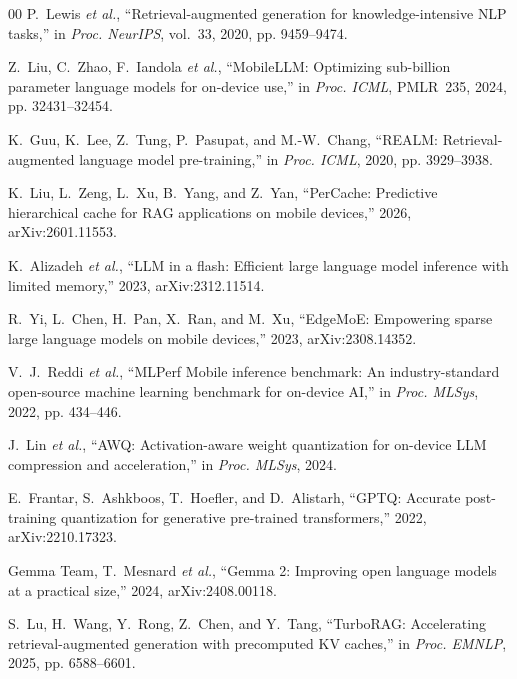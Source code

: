 \documentclass[10pt,conference]{IEEEtran}
\begin{document}
\begingroup
\scriptsize
\linespread{0.88}\selectfont
\def\IEEEbibitemsep{0pt}
\begin{thebibliography}{00}
\setlength{\itemsep}{-0.5pt plus 0.2pt}
\setlength{\parskip}{0pt}
P.~Lewis \textit{et al.}, ``Retrieval-augmented generation for knowledge-intensive {NLP} tasks,'' in \textit{Proc. NeurIPS}, vol.~33, 2020, pp. 9459--9474.

Z.~Liu, C.~Zhao, F.~Iandola \textit{et al.}, ``{MobileLLM}: Optimizing sub-billion parameter language models for on-device use,'' in \textit{Proc. ICML}, PMLR~235, 2024, pp. 32431--32454.

K.~Guu, K.~Lee, Z.~Tung, P.~Pasupat, and M.-W.~Chang, ``{REALM}: Retrieval-augmented language model pre-training,'' in \textit{Proc. ICML}, 2020, pp. 3929--3938.

K.~Liu, L.~Zeng, L.~Xu, B.~Yang, and Z.~Yan, ``{PerCache}: Predictive hierarchical cache for {RAG} applications on mobile devices,'' 2026, arXiv:2601.11553.

K.~Alizadeh \textit{et al.}, ``{LLM} in a flash: Efficient large language model inference with limited memory,'' 2023, arXiv:2312.11514.

R.~Yi, L.~Chen, H.~Pan, X.~Ran, and M.~Xu, ``{EdgeMoE}: Empowering sparse large language models on mobile devices,'' 2023, arXiv:2308.14352.

V.~J.~Reddi \textit{et al.}, ``{MLPerf Mobile} inference benchmark: An industry-standard open-source machine learning benchmark for on-device {AI},'' in \textit{Proc. MLSys}, 2022, pp. 434--446.

J.~Lin \textit{et al.}, ``{AWQ}: Activation-aware weight quantization for on-device {LLM} compression and acceleration,'' in \textit{Proc. MLSys}, 2024.

E.~Frantar, S.~Ashkboos, T.~Hoefler, and D.~Alistarh, ``{GPTQ}: Accurate post-training quantization for generative pre-trained transformers,'' 2022, arXiv:2210.17323.

{Gemma Team}, T.~Mesnard \textit{et al.}, ``Gemma 2: Improving open language models at a practical size,'' 2024, arXiv:2408.00118.

S.~Lu, H.~Wang, Y.~Rong, Z.~Chen, and Y.~Tang, ``{TurboRAG}: Accelerating retrieval-augmented generation with precomputed {KV} caches,'' in \textit{Proc. EMNLP}, 2025, pp. 6588--6601.


\end{thebibliography}
\end{document}
